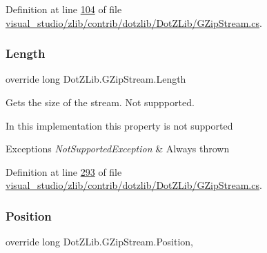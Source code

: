 Definition at line \hyperlink{visual__studio_2zlib_2contrib_2dotzlib_2_dot_z_lib_2_g_zip_stream_8cs_source_l00104}{104} of file \hyperlink{visual__studio_2zlib_2contrib_2dotzlib_2_dot_z_lib_2_g_zip_stream_8cs_source}{visual\+\_\+studio/zlib/contrib/dotzlib/\+Dot\+Z\+Lib/\+G\+Zip\+Stream.\+cs}.

\mbox{\label{class_dot_z_lib_1_1_g_zip_stream_ad63ba8f24f1661998780789390fef4ac}} 
\subsubsection{\texorpdfstring{Length}{Length}}
{\footnotesize\ttfamily override long Dot\+Z\+Lib.\+G\+Zip\+Stream.\+Length\hspace{0.3cm}{\ttfamily [get]}}



Gets the size of the stream. Not suppported. 

In this implementation this property is not supported


\begin{DoxyExceptions}{Exceptions}
{\em Not\+Supported\+Exception} & Always thrown\\
\hline
\end{DoxyExceptions}


Definition at line \hyperlink{visual__studio_2zlib_2contrib_2dotzlib_2_dot_z_lib_2_g_zip_stream_8cs_source_l00293}{293} of file \hyperlink{visual__studio_2zlib_2contrib_2dotzlib_2_dot_z_lib_2_g_zip_stream_8cs_source}{visual\+\_\+studio/zlib/contrib/dotzlib/\+Dot\+Z\+Lib/\+G\+Zip\+Stream.\+cs}.

\mbox{\label{class_dot_z_lib_1_1_g_zip_stream_a408186c8247fd657799518aac256d6d7}} 
\subsubsection{\texorpdfstring{Position}{Position}}
{\footnotesize\ttfamily override long Dot\+Z\+Lib.\+G\+Zip\+Stream.\+Position\hspace{0.3cm}{\ttfamily [get]}, {\ttfamily [set]}}



